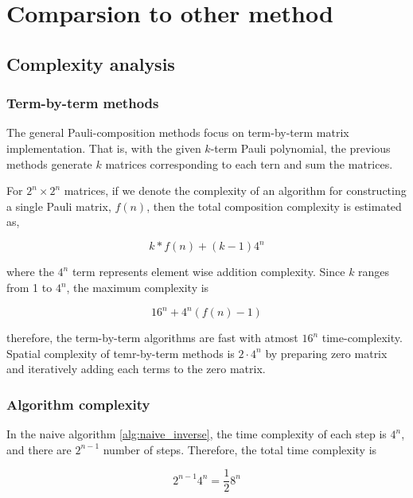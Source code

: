 \documentclass[twocolumn]{article}
\begin{document}
\section{Comparsion to other method}

\subsection{Complexity analysis}

\subsubsection{Term-by-term methods}

The general Pauli-composition methods focus on 
term-by-term matrix implementation. That is, with the given 
$k$-term Pauli polynomial, the previous methods generate $k$ matrices corresponding to 
each tern and sum the matrices.

For $2^n \times 2^n$ matrices, if we denote the complexity of an algorithm for constructing a single Pauli matrix,
$f(n)$, then the total composition complexity is estimated as,

\begin{equation}
    \label{eq:k-complexity}
    k * f(n) + (k-1) 4^n
\end{equation}

where the $4^n$ term represents element wise addition complexity.
Since $k$ ranges from 1 to $4^n$, the maximum complexity is

\begin{equation}
    \label{eq:max_complexity}
    16^n + 4^n(f(n)-1)
\end{equation}

therefore, the term-by-term algorithms are fast with atmost $16^n$ time-complexity.
Spatial complexity of temr-by-term methods is $2 \cdot 4^n$ by preparing 
zero matrix and iteratively adding each terms to the zero matrix.

\subsubsection{Algorithm complexity}

In the naive algorithm \ref{alg:naive_inverse},
the time complexity of each step is $4^n$, and there are $2^{n-1}$ 
number of steps. Therefore, the total time complexity is 

\begin{equation}
    2^{n-1} 4^n = \frac{1}{2}8^n
\end{equation}
\end{document}
